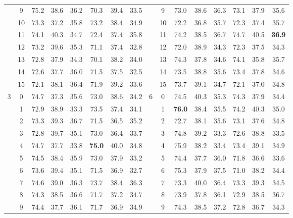\begin{table}[p]
{\begin{tabular}{c c | c c c | c c c || c c | c c c | c c c}
             & 9 & 75.2 & 38.6 & 36.2 & 70.3 & 39.4 & 33.5 &  & 9 & 73.0 & 38.6 & 36.3 & 73.1 & 37.9 & 35.6 \\
             & 10 & 73.3 & 37.2 & 35.8 & 73.2 & 38.4 & 34.9 &  & 10 & 72.2 & 36.8 & 35.7 & 72.3 & 37.4 & 35.7 \\
             & 11 & 74.1 & 40.3 & 34.7 & 72.4 & 37.4 & 35.8 &  & 11 & 74.2 & 38.5 & 36.7 & 74.7 & 40.5 & \textbf{36.9} \\
             & 12 & 73.2 & 39.6 & 35.3 & 71.1 & 37.4 & 32.8 &  & 12 & 72.0 & 38.9 & 34.3 & 72.3 & 37.5 & 34.3 \\
             & 13 & 72.8 & 37.9 & 34.3 & 70.1 & 38.2 & 34.0 &  & 13 & 74.3 & 37.8 & 34.6 & 74.1 & 35.8 & 35.7 \\
             & 14 & 72.6 & 37.7 & 36.0 & 71.5 & 37.5 & 32.5 &  & 14 & 73.5 & 38.8 & 35.6 & 73.4 & 37.8 & 34.6 \\
             & 15 & 72.1 & 38.1 & 36.4 & 71.9 & 39.2 & 33.6 &  & 15 & 73.7 & 39.1 & 34.7 & 72.1 & 37.0 & 34.8 \\
            \midrule
            \multirow{16}{*}{3} & 0 & 74.7 & 37.3 & 35.6 & 73.0 & 38.6 & 34.2 & \multirow{16}{*}{6} & 0 & 74.5 & 40.3 & 35.3 & 74.3 & 37.9 & 34.4 \\
             & 1 & 72.9 & 38.9 & 33.3 & 73.5 & 37.4 & 34.1 &  & 1 & \textbf{76.0} & 38.4 & 35.5 & 74.2 & 40.3 & 35.0 \\
             & 2 & 73.3 & 39.3 & 36.7 & 71.5 & 36.5 & 35.2 &  & 2 & 72.7 & 38.1 & 35.6 & 73.1 & 37.6 & 34.8 \\
             & 3 & 72.8 & 39.7 & 35.1 & 73.0 & 36.4 & 33.7 &  & 3 & 74.8 & 39.2 & 33.3 & 72.6 & 38.8 & 33.5 \\
             & 4 & 74.7 & 37.7 & 33.8 & \textbf{75.0} & 40.0 & 34.8 &  & 4 & 75.9 & 38.2 & 33.4 & 73.4 & 39.1 & 34.9 \\
             & 5 & 74.5 & 38.4 & 35.9 & 73.0 & 37.9 & 33.2 &  & 5 & 74.4 & 37.7 & 36.0 & 71.8 & 36.6 & 33.6 \\
             & 6 & 73.6 & 39.4 & 35.1 & 71.5 & 36.9 & 32.7 &  & 6 & 75.3 & 37.9 & 37.5 & 71.0 & 38.2 & 34.4 \\
             & 7 & 74.6 & 39.0 & 36.3 & 73.7 & 38.4 & 36.3 &  & 7 & 73.3 & 40.0 & 36.4 & 73.3 & 39.3 & 34.5 \\
             & 8 & 74.3 & 38.5 & 36.6 & 71.7 & 37.2 & 34.7 &  & 8 & 73.9 & 37.8 & 36.1 & 72.9 & 38.5 & 36.7 \\
             & 9 & 74.4 & 37.7 & 36.1 & 71.7 & 36.9 & 34.9 &  & 9 & 74.3 & 38.5 & 37.2 & 72.8 & 36.7 & 34.3 \\

\end{tabular}}
\end{table}
